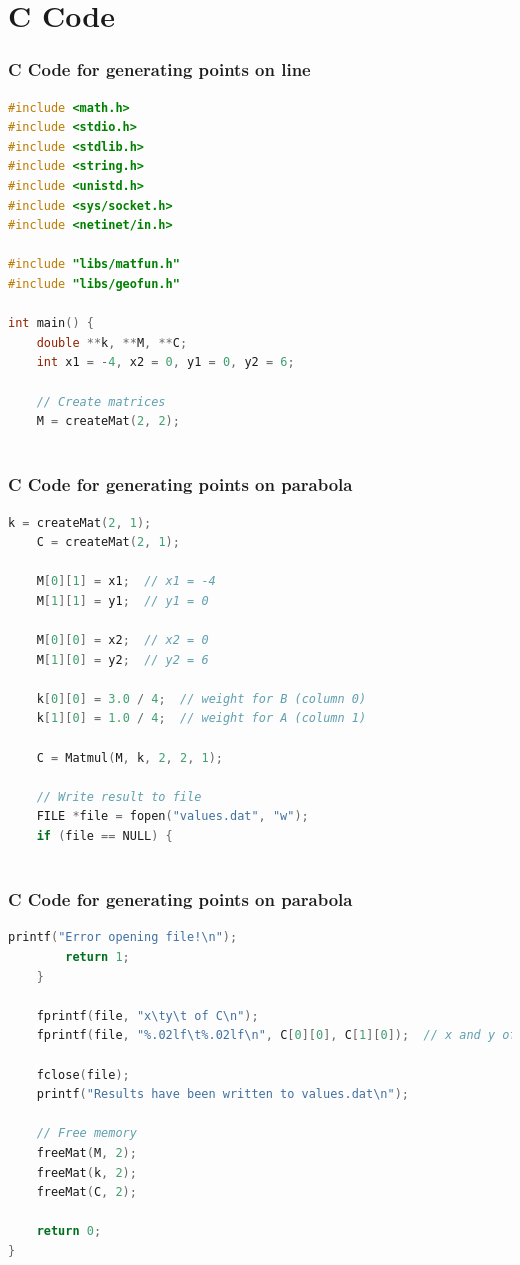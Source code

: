 \documentclass{beamer}
\theoremstyle{remark}
\numberwithin{equation}{section}
\begin{document}
\section{C Code}
\begin{frame}[fragile]
\frametitle{C Code for generating points on line}
\begin{lstlisting}[language=C]
#include <math.h>
#include <stdio.h>
#include <stdlib.h>
#include <string.h>
#include <unistd.h>
#include <sys/socket.h>
#include <netinet/in.h>

#include "libs/matfun.h"
#include "libs/geofun.h"

int main() {
    double **k, **M, **C;
    int x1 = -4, x2 = 0, y1 = 0, y2 = 6;

    // Create matrices
    M = createMat(2, 2);
 
    \end{lstlisting}
\end{frame}
\begin{frame}[fragile]
\frametitle{C Code for generating points on parabola}
\begin{lstlisting}[language=C]
   k = createMat(2, 1);
    C = createMat(2, 1);

    M[0][1] = x1;  // x1 = -4
    M[1][1] = y1;  // y1 = 0

    M[0][0] = x2;  // x2 = 0
    M[1][0] = y2;  // y2 = 6
    
    k[0][0] = 3.0 / 4;  // weight for B (column 0)
    k[1][0] = 1.0 / 4;  // weight for A (column 1)

    C = Matmul(M, k, 2, 2, 1);

    // Write result to file
    FILE *file = fopen("values.dat", "w");
    if (file == NULL) {
 
\end{lstlisting}
\end{frame}

\begin{frame}[fragile]
\frametitle{C Code for generating points on parabola}
\begin{lstlisting}[language=C]
       printf("Error opening file!\n");
        return 1;
    }

    fprintf(file, "x\ty\t of C\n");
    fprintf(file, "%.02lf\t%.02lf\n", C[0][0], C[1][0]);  // x and y of C

    fclose(file);
    printf("Results have been written to values.dat\n");

    // Free memory
    freeMat(M, 2);
    freeMat(k, 2);
    freeMat(C, 2);

    return 0;
}
\end{lstlisting}
\end{frame}
\end{document}
